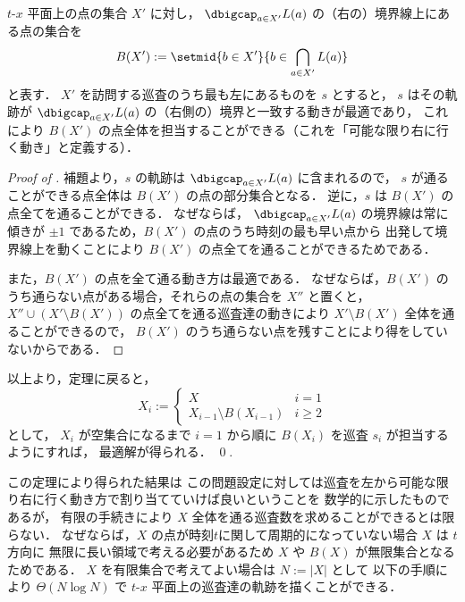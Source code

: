 \begin{lemm}
	\label{lemm:xt_decided_3}
	$t$-$x$ 平面上の点の集合 $X'$ に対し，
	$\dbigcap_{a \in X'} L(a)$ の（右の）境界線上にある点の集合を
	\[
		B(X') := \setmid{ b \in X'}{ b \in \bigcap_{a \in X'} L(a) }
	\]
	と表す．
	$X'$ を訪問する巡査のうち最も左にあるものを $s$ とすると，
	$s$ はその軌跡が $\dbigcap_{a \in X'} L(a)$ の（右側の）境界と一致する動きが最適であり，
	これにより $B(X')$ の点全体を担当することができる（これを「可能な限り右に行く動き」と定義する）．
\end{lemm}


\begin{proof}[Proof of ]
	補題より，$s$ の軌跡は
	$\dbigcap_{a \in X'} L(a)$ に含まれるので，
	$s$ が通ることができる点全体は
	$B(X')$ の点の部分集合となる．
	逆に，$s$ は $B(X')$ の点全てを通ることができる．
	なぜならば， $\dbigcap_{a \in X'} L(a)$ の境界線は常に
	傾きが $\pm 1$ であるため，$B(X')$ の点のうち時刻の最も早い点から
	出発して境界線上を動くことにより
	$B(X')$ の点全てを通ることができるためである．

	また，$B(X')$ の点を全て通る動き方は最適である．
	なぜならば，$B(X')$ のうち通らない点がある場合，それらの点の集合を $X''$ と置くと，
	$X'' \cup (X' \setminus B(X'))$ の点全てを通る巡査達の動きにより
	$X' \setminus B(X')$ 全体を通ることができるので，
	$B(X')$ のうち通らない点を残すことにより得をしていないからである．
\end{proof}


以上より，定理に戻ると，
\[
X_i := 
\begin{cases}
	X & i = 1 \\
	X_{i - 1} \setminus B(X_{i - 1}) & i \geq 2
\end{cases}
\]
として，
$X_i$ が空集合になるまで $i = 1$ から順に $B(X_i)$ を巡査 $s_i$ が担当するようにすれば，
最適解が得られる．
\qed {}.

この定理により得られた結果は
この問題設定に対しては巡査を左から可能な限り右に行く動き方で割り当てていけば良いということを
数学的に示したものであるが，
有限の手続きにより $X$ 全体を通る巡査数を求めることができるとは限らない．
なぜならば，$X$ の点が時刻$t$に関して周期的になっていない場合 $X$ は $t$ 方向に
無限に長い領域で考える必要があるため $X$ や $B(X)$ が無限集合となるためである．
$X$ を有限集合で考えてよい場合は $N := |X|$ として
以下の手順により $\Theta(N \log N)$ で
$t$-$x$ 平面上の巡査達の軌跡を描くことができる．


